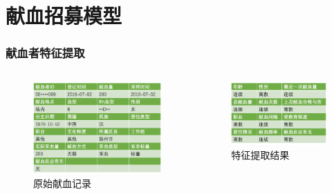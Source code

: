 \documentclass[10pt,aspectratio=43,mathserif]{beamer}
\begin{document}
\section[模型]{献血招募模型}


		\begin{frame}
		  \frametitle{\textbf{献血者特征提取}}
            \begin{columns}
                \footnotesize
                \begin{figure}[!t]
                    \centering
                    \includegraphics[width=1\textwidth]{figures/record.png}
                    \caption{原始献血记录}
                \end{figure}

                \begin{figure}[!t]
                    \centering
                    \includegraphics[width=1\textwidth]{figures/feature.png}
                    \caption{特征提取结果}
                \end{figure}
                
            \end{columns}

		\end{frame}
\end{document}
